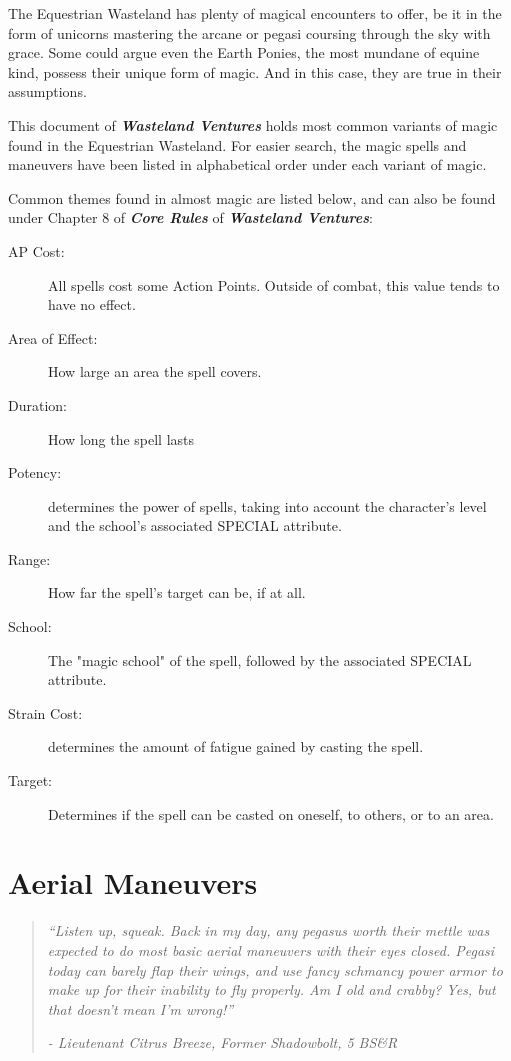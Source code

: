 \documentclass[11pt,a4paper,twocolumn]{book}
\begin{document}
The Equestrian Wasteland has plenty of magical encounters to offer, be it in the form of unicorns mastering the arcane or pegasi coursing through the sky with grace. Some could argue even the Earth Ponies, the most mundane of equine kind, possess their unique form of magic. And in this case, they are true in their assumptions.

This document of \emph{\textbf{Wasteland Ventures}} holds most common variants of magic found in the Equestrian Wasteland. For easier search, the magic spells and maneuvers have been listed in alphabetical order under each variant of magic.

Common themes found in almost magic are listed below, and can also be found under Chapter 8 of \emph{\textbf{Core Rules}} of \emph{\textbf{Wasteland Ventures}}:

\begin{description}
	\item[AP Cost:] All spells cost some Action Points. Outside of combat, this value tends to have no effect.
	\item[Area of Effect:] How large an area the spell covers.
	\item[Duration:] How long the spell lasts
	\item[Potency:] determines the power of spells, taking into account the character's level and the school's associated SPECIAL attribute.
	\item[Range:] How far the spell's target can be, if at all.
	\item[School:] The "magic school" of the spell, followed by the associated SPECIAL attribute.
	\item[Strain Cost:] determines the amount of fatigue gained by casting the spell. 
	\item[Target:] Determines if the spell can be casted on oneself, to others, or to an area.
	
\end{description} 


\chapter{Aerial Maneuvers}
\begin{quote}
	\emph{``Listen up, squeak. Back in my day, any pegasus worth their mettle was expected to do most basic aerial maneuvers with their eyes closed. Pegasi today can barely flap their wings, and use fancy schmancy power armor to make up for their inability to fly properly. Am I old and crabby? Yes, but that doesn't mean I'm wrong!''}
	
	\emph{- Lieutenant Citrus Breeze, Former Shadowbolt, 5 BS\&R}
\end{quote}
\end{document}

